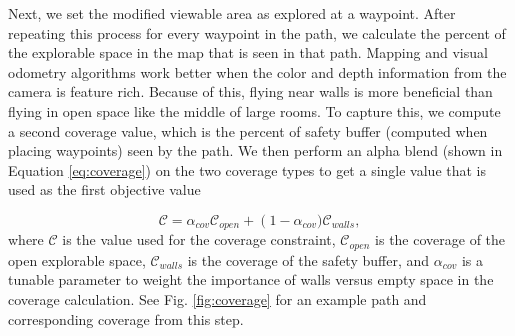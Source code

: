 \documentclass[letterpaper, 10 pt, conference]{ieeeconf}  %
\begin{document}
 Next, we set the modified viewable area as explored at a waypoint. After repeating this process for every waypoint in the path, we calculate the percent of the explorable space in the map that is seen in that path. Mapping and visual odometry algorithms work better when the color and depth information from the camera is feature rich. Because of this, flying near walls is more beneficial than flying in open space like the middle of large rooms. To capture this, we compute a second coverage value, which is the percent of safety buffer (computed when placing waypoints) seen by the path. We then perform an alpha blend (shown in Equation \ref{eq:coverage}) on the two coverage types to get a single value that is used as the first objective value

\begin{equation}\label{eq:coverage}%
    \mathcal{C} = \alpha_{\mathit{cov}} \mathcal{C}_{\mathit{open}} + \left(1-\alpha_{\mathit{cov}})\right. \mathcal{C}_{\mathit{walls}},
\end{equation}
%
where $\mathcal{C}$ is the value used for the coverage constraint, $\mathcal{C}_{\mathit{open}}$ is the coverage of the open explorable space, $\mathcal{C}_{\mathit{walls}}$ is the coverage of the safety buffer, and $\alpha_{\mathit{cov}}$ is a tunable parameter to weight the importance of walls versus empty space in the coverage calculation. See Fig. \ref{fig:coverage} for an example path and corresponding coverage from this step.
\end{document}
